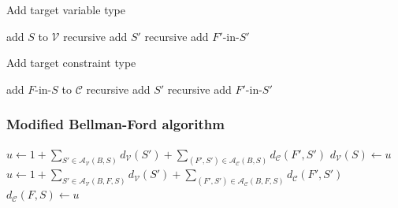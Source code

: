 \documentclass{beamer}
\begin{document}
\begin{frame}{Add target variable type}
  \begin{algorithm}[H]
    \caption{recursive add $S$}
    \begin{algorithmic}
      \STATE add $S$ to $\mathcal{V}$
            \STATE recursive add $S'$
          \ENDIF
        \ENDFOR
            \STATE recursive add $F'$-in-$S'$
          \ENDIF
        \ENDFOR
      \ENDFOR
    \end{algorithmic}
  \end{algorithm}
\end{frame}

\begin{frame}{Add target constraint type}
  \begin{algorithm}[H]
    \caption{recursive add $F$-in-$S$}
    \begin{algorithmic}
      \STATE add $F$-in-$S$ to $\mathcal{C}$
            \STATE recursive add $S'$
          \ENDIF
        \ENDFOR
            \STATE recursive add $F'$-in-$S'$
          \ENDIF
        \ENDFOR
      \ENDFOR
    \end{algorithmic}
  \end{algorithm}
\end{frame}

\begin{frame}
  \frametitle{Modified Bellman-Ford algorithm}
  \begin{algorithmic}
				\STATE $u \leftarrow 1 + \sum_{S' \in \mathcal{A}_\mathcal{V}(B, S)} d_\mathcal{V}(S') + \sum_{(F', S') \in \mathcal{A}_\mathcal{C}(B, S)} d_\mathcal{C}(F', S')$
					\STATE $d_\mathcal{V}(S) \leftarrow u$
				\ENDIF
      \ENDFOR
				\STATE $u \leftarrow 1 + \sum_{S' \in \mathcal{A}_\mathcal{V}(B, F, S)} d_\mathcal{V}(S') + \sum_{(F', S') \in \mathcal{A}_\mathcal{C}(B, F, S)} d_\mathcal{C}(F', S')$
					\STATE $d_\mathcal{C}(F, S) \leftarrow u$
				\ENDIF
      \ENDFOR
    \ENDWHILE
  \end{algorithmic}
\end{frame}
\end{document}
